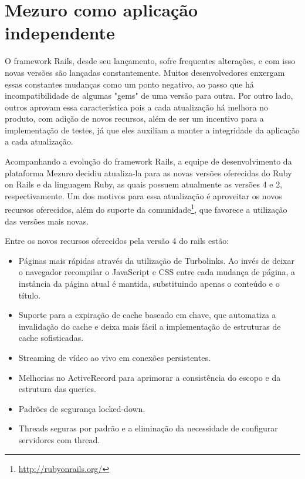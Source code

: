 \section{Mezuro como aplicação independente}


O framework Rails, desde seu lançamento, sofre frequentes alterações, e com isso novas versões são lançadas constantemente. Muitos desenvolvedores enxergam essas constantes mudanças como um ponto negativo, ao passo que há incompatibilidade de algumas "gems" de uma versão para outra. Por outro lado, outros aprovam essa característica pois a cada atualização há melhora no produto, com adição de novos recursos, além de ser um incentivo para a implementação de testes, já que eles auxiliam a manter a integridade da aplicação a cada atualização.

Acompanhando a evolução do framework Rails, a equipe de desenvolvimento da plataforma Mezuro decidiu atualiza-la para as novas versões oferecidas do Ruby on Rails e da linguagem Ruby, as quais possuem atualmente as versões 4 e 2, respectivamente. Um dos motivos para essa atualização é aproveitar os novos recursos oferecidos, além do suporte da comunidade\footnote{\url{http://rubyonrails.org/}}, que favorece a utilização das versões mais novas.

Entre os novos recursos oferecidos pela versão 4 do rails estão:

\begin{itemize}
\item Páginas mais rápidas através da utilização de Turbolinks. Ao invés de deixar o navegador recompilar o JavaScript e CSS entre cada mudança de página, a instância da página atual é mantida, substituindo apenas o conteúdo e o título.
\item Suporte para a expiração de cache baseado em chave, que automatiza a invalidação do cache e deixa mais fácil a implementação de estruturas de cache sofisticadas.
\item Streaming de vídeo ao vivo em conexões persistentes.
\item Melhorias no ActiveRecord para aprimorar a consistência do escopo e da estrutura das queries.
\item Padrões de segurança locked-down.
\item Threads seguras por padrão e a eliminação da necessidade de configurar servidores com thread.
\end{itemize}

